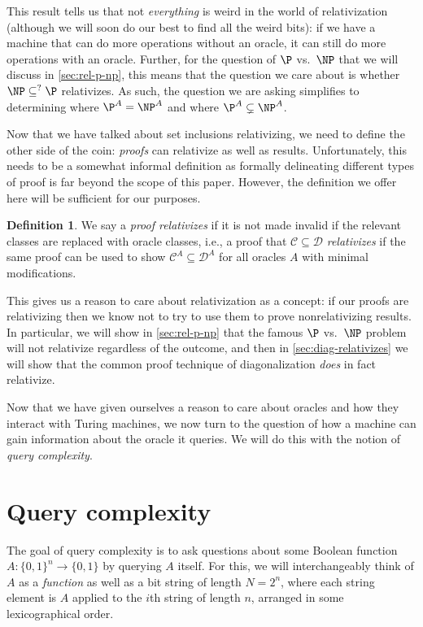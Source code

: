 \documentclass[english,12pt]{reedthesis}
\theoremstyle{plain}
\theoremstyle{definition}
\newtheorem{defn}[defn]{Definition}
\theoremstyle{remark}
\begin{document}
This result tells us that not \emph{everything} is weird in the world of
relativization (although we will soon do our best to find all the weird bits):
if we have a machine that can do more operations without an oracle, it can still
do more operations with an oracle. Further, for the question of $\P$ vs.\ $\NP$
that we will discuss in \cref{sec:rel-p-np}, this means that the question we
care about is whether $\NP \subseteq^{?} \P$ relativizes. As such, the question we are
asking simplifies to determining where $\P^{A} = \NP^{A}$ and where
$\P^{A} \subsetneq \NP^{A}$.

Now that we have talked about set inclusions relativizing, we need to define the
other side of the coin: \emph{proofs} can relativize as well as results.
Unfortunately, this needs to be a somewhat informal definition as formally
delineating different types of proof is far beyond the scope of this paper.
However, the definition we offer here will be sufficient for our purposes.

\begin{defn}\label{def:relativizing-result}
  We say a \emph{proof relativizes} if it is not made invalid if the relevant
  classes are replaced with oracle classes, i.e., a proof that $\mathcal{C} \subseteq \mathcal{D}$
  \emph{relativizes} if the same proof can be used to show $\mathcal{C}^{A} \subseteq \mathcal{D}^{A}$ for
  all oracles $A$ with minimal modifications.
\end{defn}

This gives us a reason to care about relativization as a concept: if our proofs
are relativizing then we know not to try to use them to prove nonrelativizing
results. In particular, we will show in \cref{sec:rel-p-np} that the famous $\P$
vs.\ $\NP$ problem will not relativize regardless of the outcome, and then in
\cref{sec:diag-relativizes} we will show that the common proof technique of
diagonalization \emph{does} in fact relativize.

Now that we have given ourselves a reason to care about oracles and how they
interact with Turing machines, we now turn to the question of how a machine can
gain information about the oracle it queries. We will do this with the notion of
\emph{query complexity}.

\section{Query complexity}\label{sec:query-complexity}

The goal of query complexity is to ask questions about some Boolean function
$A\colon \{0, 1\}^{n} \rightarrow \{0, 1\}$ by querying $A$ itself. For this, we will
interchangeably think of $A$ as a \emph{function} as well as a bit string of
length $N = 2^{n}$, where each string element is $A$ applied to the $i$th string
of length $n$, arranged in some lexicographical
order. %
\end{document}
